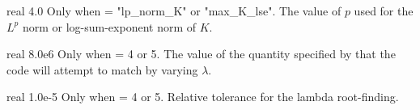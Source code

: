 \myhrule

{real}
{4.0}
{Only when  = {\ttfamily "lp\_norm\_K"} or {\ttfamily "max\_K\_lse"}.}
{The value of $p$ used for the $L^p$ norm or log-sum-exponent norm of $K$.}

\myhrule

{real}
{8.0e6}
{Only when  = 4 or 5.}
{The value of the quantity specified by  that the code will attempt to match
by varying $\lambda$.
}

\myhrule

{real}
{1.0e-5}
{Only when  = 4 or 5.}
{Relative tolerance for the lambda root-finding.}

\myhrule

